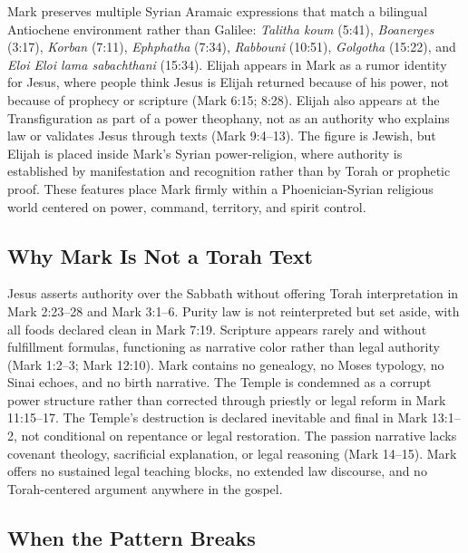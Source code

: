 Mark preserves multiple Syrian Aramaic expressions that match a bilingual Antiochene environment rather than Galilee: \emph{Talitha koum} (5:41), \emph{Boanerges} (3:17), \emph{Korban} (7:11), \emph{Ephphatha} (7:34), \emph{Rabbouni} (10:51), \emph{Golgotha} (15:22), and \emph{Eloi Eloi lama sabachthani} (15:34).
Elijah appears in Mark as a rumor identity for Jesus, where people think Jesus is Elijah returned because of his power, not because of prophecy or scripture (Mark 6:15; 8:28).
Elijah also appears at the Transfiguration as part of a power theophany, not as an authority who explains law or validates Jesus through texts (Mark 9:4--13).
The figure is Jewish, but Elijah is placed inside Mark's Syrian power-religion, where authority is established by manifestation and recognition rather than by Torah or prophetic proof.
These features place Mark firmly within a Phoenician-Syrian religious world centered on power, command, territory, and spirit control.

\subsection{Why Mark Is Not a Torah Text}

Jesus asserts authority over the Sabbath without offering Torah interpretation in Mark 2:23--28 and Mark 3:1--6.
Purity law is not reinterpreted but set aside, with all foods declared clean in Mark 7:19.
Scripture appears rarely and without fulfillment formulas, functioning as narrative color rather than legal authority (Mark 1:2--3; Mark 12:10).
Mark contains no genealogy, no Moses typology, no Sinai echoes, and no birth narrative.
The Temple is condemned as a corrupt power structure rather than corrected through priestly or legal reform in Mark 11:15--17.
The Temple's destruction is declared inevitable and final in Mark 13:1--2, not conditional on repentance or legal restoration.
The passion narrative lacks covenant theology, sacrificial explanation, or legal reasoning (Mark 14--15).
Mark offers no sustained legal teaching blocks, no extended law discourse, and no Torah-centered argument anywhere in the gospel.

\subsection{When the Pattern Breaks}

